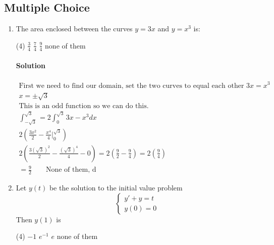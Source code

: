 \documentclass[MATH-115-Notes.tex]{subfiles}
\begin{document}
\subsection{Multiple Choice}
    

\begin{enumerate}[itemsep=5mm]
        \item The area enclosed between the curves \(y = 3x\) and \(y = x^3\) is: 
        \begin{tasks}(4)
            \task \(\frac{3}{4}\)
            \task \(\frac{7}{4}\)
            \task \(\frac{9}{4}\)
            \task none of them
        \end{tasks}
        \paragraph*{Solution}
        \begin{gather*}
            \text{First we need to find our domain, set the two curves to equal each other } 3x = x^3\\
            x = \pm\sqrt{3}\\
            \text{This is an odd function so we can do this.}\\
            \int_{-\sqrt{3}}^{\sqrt{3}} = 2 \int_{0}^{\sqrt{3}} 3x - x^3 dx\\ 
            2 \left( \frac{3x^2}{2} - \frac{x^4}{4}\Big|_0^{\sqrt{3}} \right)\\
            2 \left( \frac{3(\sqrt{3})^2}{2} - \frac{(\sqrt{3})^4}{4} - 0 \right) = 2\left(\frac{9}{2} - \frac{9}{4}\right) = 2\left(\frac{9}{4}\right)\\
            = \frac{9}{2}\qquad \text{None of them, d}
        \end{gather*}

        \item Let $y(t)$ be the solution to the initial value problem 
        \[\begin{cases}
            y' + y = t\\
            y(0) = 0
        \end{cases}\]
        Then $y(1)$ is 
        \begin{tasks}(4)
            \task \(-1\)
            \task \(e^{-1}\)
            \task \(e\)
            \task none of them
        \end{tasks}

\end{enumerate}
\end{document}
